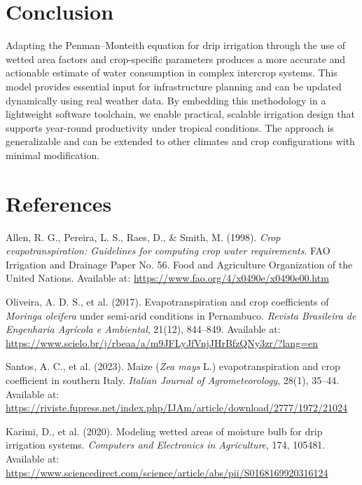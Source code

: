 \documentclass[twocolumn]{article}
\begin{document}
\section{Conclusion}
Adapting the Penman–Monteith equation for drip irrigation through the use of wetted area factors and crop-specific parameters produces a more accurate and actionable estimate of water consumption in complex intercrop systems. This model provides essential input for infrastructure planning and can be updated dynamically using real weather data. By embedding this methodology in a lightweight software toolchain, we enable practical, scalable irrigation design that supports year-round productivity under tropical conditions. The approach is generalizable and can be extended to other climates and crop configurations with minimal modification.

\section{References}
\begin{thebibliography}{8}

Allen, R. G., Pereira, L. S., Raes, D., \& Smith, M. (1998).
\textit{Crop evapotranspiration: Guidelines for computing crop water requirements}.
FAO Irrigation and Drainage Paper No. 56. Food and Agriculture Organization of the United Nations.
Available at: \url{https://www.fao.org/4/x0490e/x0490e00.htm}

Oliveira, A. D. S., et al. (2017).
Evapotranspiration and crop coefficients of \textit{Moringa oleifera} under semi-arid conditions in Pernambuco.
\textit{Revista Brasileira de Engenharia Agrícola e Ambiental}, 21(12), 844–849.
Available at: \url{https://www.scielo.br/j/rbeaa/a/m9JFLyJfVnjJHrBfzQNy3zr/?lang=en}

Santos, A. C., et al. (2023).
Maize (\textit{Zea mays} L.) evapotranspiration and crop coefficient in southern Italy.
\textit{Italian Journal of Agrometeorology}, 28(1), 35–44.
Available at: \url{https://riviste.fupress.net/index.php/IJAm/article/download/2777/1972/21024}

Karimi, D., et al. (2020).
Modeling wetted areas of moisture bulb for drip irrigation systems.
\textit{Computers and Electronics in Agriculture}, 174, 105481.
Available at: \url{https://www.sciencedirect.com/science/article/abs/pii/S0168169920316124}

\end{thebibliography}
\end{document}
